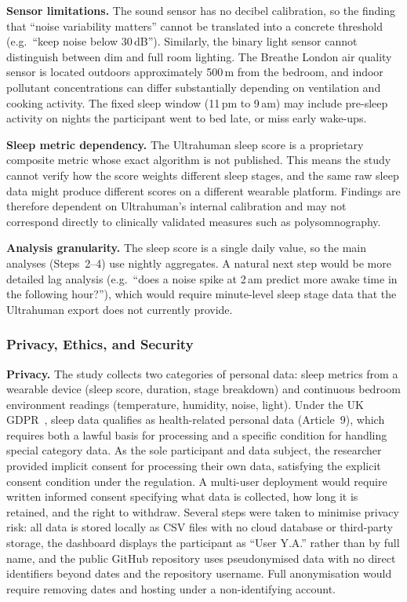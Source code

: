 \documentclass[10pt,a4paper]{extarticle}
\begin{document}
\textbf{Sensor limitations.} The sound sensor has no decibel calibration, so the finding that ``noise variability matters'' cannot be translated into a concrete threshold (e.g.\ ``keep noise below 30\,dB''). Similarly, the binary light sensor cannot distinguish between dim and full room lighting. The Breathe London air quality sensor is located outdoors approximately 500\,m from the bedroom, and indoor pollutant concentrations can differ substantially depending on ventilation and cooking activity. The fixed sleep window (11\,pm to 9\,am) may include pre-sleep activity on nights the participant went to bed late, or miss early wake-ups.

\textbf{Sleep metric dependency.} The Ultrahuman sleep score is a proprietary composite metric whose exact algorithm is not published. This means the study cannot verify how the score weights different sleep stages, and the same raw sleep data might produce different scores on a different wearable platform. Findings are therefore dependent on Ultrahuman's internal calibration and may not correspond directly to clinically validated measures such as polysomnography.

\textbf{Analysis granularity.} The sleep score is a single daily value, so the main analyses (Steps~2--4) use nightly aggregates. A natural next step would be more detailed lag analysis (e.g.\ ``does a noise spike at 2\,am predict more awake time in the following hour?''), which would require minute-level sleep stage data that the Ultrahuman export does not currently provide.

\subsubsection{Privacy, Ethics, and Security}

\textbf{Privacy.} The study collects two categories of personal data: sleep metrics from a wearable device (sleep score, duration, stage breakdown) and continuous bedroom environment readings (temperature, humidity, noise, light). Under the UK GDPR~\citep{ukgdpr2018}, sleep data qualifies as health-related personal data (Article~9), which requires both a lawful basis for processing and a specific condition for handling special category data. As the sole participant and data subject, the researcher provided implicit consent for processing their own data, satisfying the explicit consent condition under the regulation. A multi-user deployment would require written informed consent specifying what data is collected, how long it is retained, and the right to withdraw. Several steps were taken to minimise privacy risk: all data is stored locally as CSV files with no cloud database or third-party storage, the dashboard displays the participant as ``User Y.A.'' rather than by full name, and the public GitHub repository uses pseudonymised data with no direct identifiers beyond dates and the repository username. Full anonymisation would require removing dates and hosting under a non-identifying account.
\end{document}

